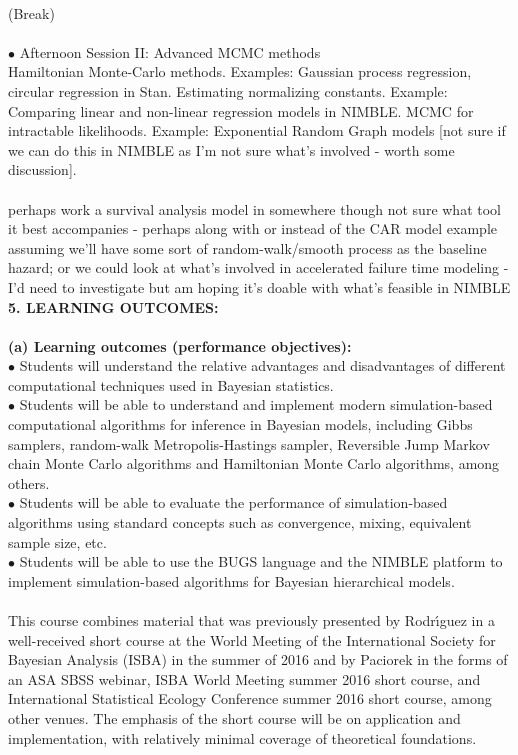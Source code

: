 \documentclass[11pt]{article}
\begin{document}
\\
(Break)\\
\\
$\bullet$ Afternoon Session II: Advanced MCMC methods\\
Hamiltonian Monte-Carlo methods.  Examples:  Gaussian process regression, circular regression {\color{blue}in Stan}.  Estimating normalizing constants.  Example:  Comparing linear and non-linear regression models in NIMBLE.  MCMC for intractable likelihoods.  Example:  Exponential Random Graph models {\color{blue}[not sure if we can do this in NIMBLE as I'm not sure what's involved - worth some discussion]}.  \\
\\
{\color{blue} perhaps work a survival analysis model in somewhere though not sure what tool it best accompanies - perhaps along with or instead of the CAR model example assuming we'll have some sort of random-walk/smooth process as the baseline hazard; or we could look at what's involved in accelerated failure time modeling - I'd need to investigate but am hoping it's doable with what's feasible in NIMBLE}
\\
{\large {\bf 5. LEARNING OUTCOMES:}}\\
\\
{\bf (a) Learning outcomes (performance objectives):}\\
$\bullet$ Students will understand the relative advantages and disadvantages of different computational techniques used in Bayesian statistics.\\
$\bullet$ Students will be able to understand and implement modern simulation-based computational algorithms for inference in Bayesian models, including Gibbs samplers, random-walk Metropolis-Hastings sampler, Reversible Jump Markov chain Monte Carlo algorithms and Hamiltonian Monte Carlo algorithms, among others.\\
$\bullet$ Students will be able to evaluate the performance of simulation-based algorithms using standard concepts such as convergence, mixing, equivalent sample size, etc.\\
$\bullet$ Students will be able to use the BUGS language and the NIMBLE platform to implement simulation-based algorithms for Bayesian hierarchical models.\\
\\
This course combines material that was previously presented by Rodr\'{\i}guez in a well-received short course at the World Meeting of the International Society for Bayesian Analysis (ISBA) in the summer of 2016 and by Paciorek in the forms of an ASA SBSS webinar, ISBA World Meeting summer 2016 short course, and International Statistical Ecology Conference summer 2016 short course, among other venues. The emphasis of the short course will be on application and implementation, with relatively minimal coverage of theoretical foundations.  
\end{document}
